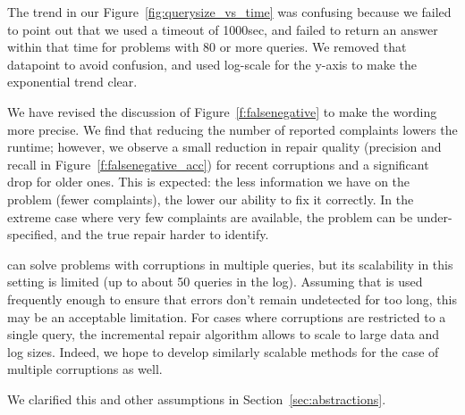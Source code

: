 The trend in our Figure~\ref{fig:querysize_vs_time} was confusing because we
failed to point out that we used a timeout of 1000sec, and \naive failed to
return an answer within that time for problems with 80 or more queries. We
removed that datapoint to avoid confusion, and used log-scale for the y-axis
to make the exponential trend clear.



% 

\begin{quote}
\end{quote}

We have revised the discussion of Figure~\ref{f:falsenegative} to make the wording more precise.
We find that reducing the number of reported complaints lowers the
runtime; however, we observe a small reduction in repair quality (precision
and recall in Figure~\ref{f:falsenegative_acc}) for recent corruptions and a
significant drop for older ones. This is expected: the less information we
have on the problem (fewer complaints), the lower our ability to fix it
correctly. In the extreme case where very few complaints are available, the
problem can be under-specified, and the true repair harder to identify.

\begin{quote}
\end{quote}

\sys can solve problems with corruptions in multiple queries, but its
scalability in this setting is limited (up to about 50 queries in the log).
Assuming that \sys is used frequently enough to ensure that errors don't
remain undetected for too long, this may be an acceptable limitation. For
cases where corruptions are restricted to a single query, the incremental
repair algorithm allows \sys to scale to large data and log sizes. Indeed, we
hope to develop similarly scalable methods for the case of multiple
corruptions as well.

We  clarified this and other assumptions in Section~\ref{sec:abstractions}. 


